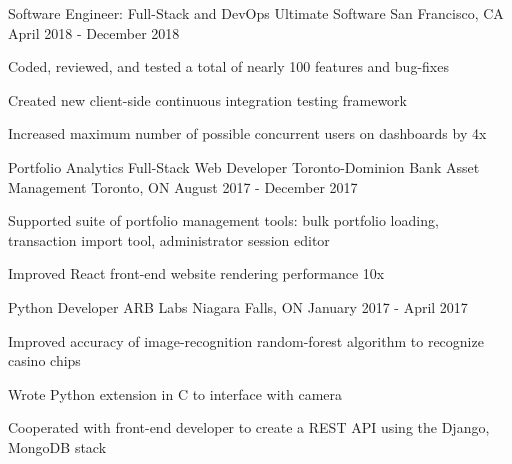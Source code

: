 

\addvspace{1ex}

\begin{cventries}

\cventry
{Software Engineer: Full-Stack and DevOps} %
{Ultimate Software} %
{San Francisco, CA} %
{April 2018 - December 2018} %
{ %
\begin{cvitems}
\item {Coded, reviewed, and tested a total of nearly 100 features and bug-fixes}
\item {Created new client-side continuous integration testing framework}
\item {Increased maximum number of possible concurrent users on dashboards by 4x}
\end{cvitems}
}

\cventry
{Portfolio Analytics Full-Stack Web Developer} %
{Toronto-Dominion Bank Asset Management} %
{Toronto, ON} %
{August 2017 - December 2017} %
{ %
\begin{cvitems}
\item {Supported suite of portfolio management tools: bulk portfolio loading, transaction import tool, administrator session editor}
\item {Improved React front-end website rendering performance 10x}
\end{cvitems}
}


\cventry
{Python Developer} %
{ARB Labs} %
{Niagara Falls, ON} %
{January 2017 - April 2017} %
{ %
\begin{cvitems}
\item {Improved accuracy of image-recognition random-forest algorithm to recognize casino chips}
\item {Wrote Python extension in C to interface with camera}
\item {Cooperated with front-end developer to create a REST API using the Django, MongoDB stack}
\end{cvitems}
}


\end{cventries}
